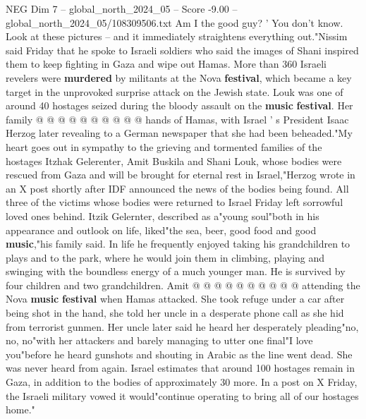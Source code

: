 \begin{textsample}{NEG Dim 7 – global\_north\_2024\_05 – Score -9.00 – global\_north\_2024\_05/108309506.txt}
Am I the good guy? ' You don't know.
Look at these pictures -- and it immediately straightens everything out."Nissim said Friday that he spoke to Israeli soldiers who said the images of Shani inspired them to keep fighting in Gaza and wipe out Hamas.
More than 360 Israeli revelers were \textbf{murdered} by militants at the Nova \textbf{festival}, which became a key target in the unprovoked surprise attack on the Jewish state.
Louk was one of around 40 hostages seized during the bloody assault on the \textbf{music} \textbf{festival}.
Her family @ @ @ @ @ @ @ @ @ @ hands of Hamas, with Israel ' s President Isaac Herzog later revealing to a German newspaper that she had been beheaded."My heart goes out in sympathy to the grieving and tormented families of the hostages Itzhak Gelerenter, Amit Buskila and Shani Louk, whose bodies were rescued from Gaza and will be brought for eternal rest in Israel,"Herzog wrote in an X post shortly after IDF announced the news of the bodies being found.
All three of the victims whose bodies were returned to Israel Friday left sorrowful loved ones behind.
Itzik Gelernter, described as a"young soul"both in his appearance and outlook on life, liked"the sea, beer, good food and good \textbf{music},"his family said.
In life he frequently enjoyed taking his grandchildren to plays and to the park, where he would join them in climbing, playing and swinging with the boundless energy of a much younger man.
He is survived by four children and two grandchildren.
Amit @ @ @ @ @ @ @ @ @ @ attending the Nova \textbf{music} \textbf{festival} when Hamas attacked.
She took refuge under a car after being shot in the hand, she told her uncle in a desperate phone call as she hid from terrorist gunmen.
Her uncle later said he heard her desperately pleading"no, no, no"with her attackers and barely managing to utter one final"I love you"before he heard gunshots and shouting in Arabic as the line went dead.
She was never heard from again.
Israel estimates that around 100 hostages remain in Gaza, in addition to the bodies of approximately 30 more.
In a post on X Friday, the Israeli military vowed it would"continue operating to bring all of our hostages home."

\end{textsample}
